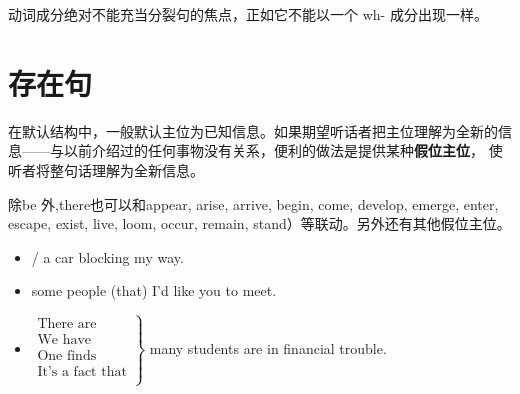 动词成分绝对不能充当分裂句的焦点，正如它不能以一个 wh- 成分出现一样。


\section{存在句}
\label{subsec:behave}

在默认结构中，一般默认主位为已知信息。如果期望听话者把主位理解为全新的信
息——与以前介绍过的任何事物没有关系，便利的做法是提供某种\textbf{假位主位}，
使听者将整句话理解为全新信息。

除be 外,there也可以和appear, arise, arrive, begin, come, develop,
emerge, enter, escape, exist, live, loom, occur, remain, stand）等联动。另外还有其他假位主位。

\begin{itemize}
\item {} /  a car blocking my way.

\item {} some people (that) I'd like you to meet.

\item $\left.
    \begin{aligned}
      \text{There are} \\
      \text{We have} \\
      \text{One finds} \\
      \text{It's a fact that} \\
    \end{aligned}
  \right\}$ many students are in financial trouble.
\end{itemize}


